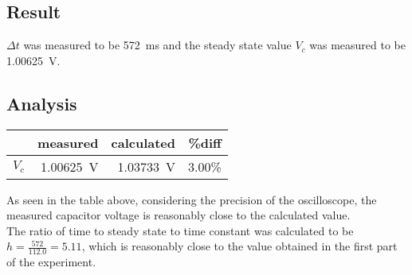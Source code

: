 \documentclass{article}
\begin{document}
\subsection*{Result}
$\Delta t$ was measured to be \SI{572}{\milli\second} and the steady state value $V_c$ was measured to be \SI{1.00625}{\volt}.

\subsection*{Analysis}
\begin{table}[H]
\centering
    \begin{tabular}{@{}r r r r@{}}
        \toprule
        &measured & calculated & \%diff \\
        \midrule
        $V_c$&\SI{1.00625}{\volt} & \SI{1.03733}{\volt} & 3.00\% \\
        \bottomrule
    \end{tabular}
\end{table}
As seen in the table above, considering the precision of the oscilloscope, the measured capacitor voltage is reasonably close to the calculated value.\\


The ratio of time to steady state to time constant was calculated to be $h=\frac{572}{112.0}=5.11$, which is reasonably close to the value obtained in the first part of the experiment.
\end{document}
